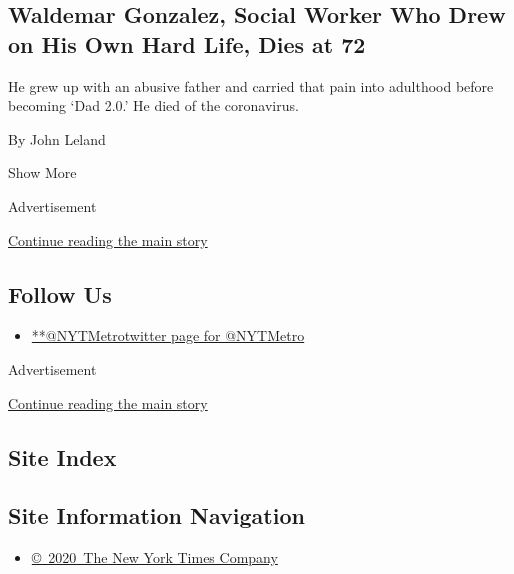 \begin{enumerate}
  \hypertarget{waldemar-gonzalez-social-worker-who-drew-on-his-own-hard-life-dies-at-72}{%
  \subsection{Waldemar Gonzalez, Social Worker Who Drew on His Own Hard
  Life, Dies at
  72}\label{waldemar-gonzalez-social-worker-who-drew-on-his-own-hard-life-dies-at-72}}

  He grew up with an abusive father and carried that pain into adulthood
  before becoming `Dad 2.0.' He died of the coronavirus.

  By John Leland
\end{enumerate}

Show More

Advertisement

\protect\hyperlink{after-mid2}{Continue reading the main story}

\hypertarget{follow-us}{%
\subsection{Follow Us}\label{follow-us}}

\begin{itemize}
\tightlist
\item
  \href{https://twitter.com/NYTMetro}{**@NYTMetrotwitter page for
  @NYTMetro}
\end{itemize}

Advertisement

\protect\hyperlink{after-mktg}{Continue reading the main story}

\hypertarget{site-index}{%
\subsection{Site Index}\label{site-index}}

\hypertarget{site-information-navigation}{%
\subsection{Site Information
Navigation}\label{site-information-navigation}}

\begin{itemize}
\tightlist
\item
  \href{https://help.nytimes3xbfgragh.onion/hc/en-us/articles/115014792127-Copyright-notice}{©~2020~The
  New York Times Company}
\end{itemize}

